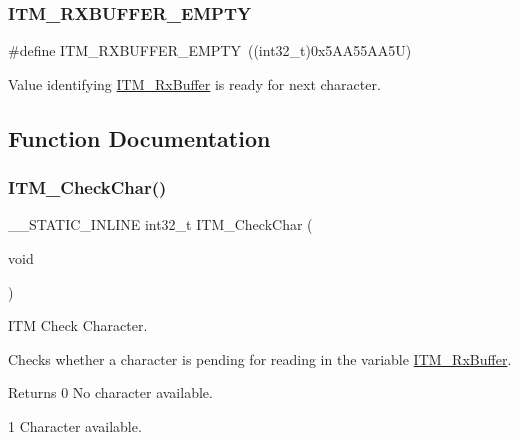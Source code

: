 \subsubsection{\texorpdfstring{ITM\_RXBUFFER\_EMPTY}{ITM\_RXBUFFER\_EMPTY}\hspace{0.1cm}{\footnotesize\ttfamily [2/2]}}
{\footnotesize\ttfamily \#define I\+T\+M\+\_\+\+R\+X\+B\+U\+F\+F\+E\+R\+\_\+\+E\+M\+P\+TY~((int32\+\_\+t)0x5\+A\+A55\+A\+A5\+U)}

Value identifying \mbox{\hyperlink{group___c_m_s_i_s__core___debug_functions_ga12e68e55a7badc271b948d6c7230b2a8}{I\+T\+M\+\_\+\+Rx\+Buffer}} is ready for next character. 

\subsection{Function Documentation}
\mbox{\label{group___c_m_s_i_s__core___debug_functions_gae61ce9ca5917735325cd93b0fb21dd29}} 
\subsubsection{\texorpdfstring{ITM\_CheckChar()}{ITM\_CheckChar()}}
{\footnotesize\ttfamily \+\_\+\+\_\+\+S\+T\+A\+T\+I\+C\+\_\+\+I\+N\+L\+I\+NE int32\+\_\+t I\+T\+M\+\_\+\+Check\+Char (\begin{DoxyParamCaption}\item[{void}]{ }\end{DoxyParamCaption})}



I\+TM Check Character. 

Checks whether a character is pending for reading in the variable \mbox{\hyperlink{group___c_m_s_i_s__core___debug_functions_ga12e68e55a7badc271b948d6c7230b2a8}{I\+T\+M\+\_\+\+Rx\+Buffer}}. \begin{DoxyReturn}{Returns}
0 No character available. 

1 Character available. 
\end{DoxyReturn}
\mbox{\label{group___c_m_s_i_s__core___debug_functions_gac3ee2c30a1ac4ed34c8a866a17decd53}} 
